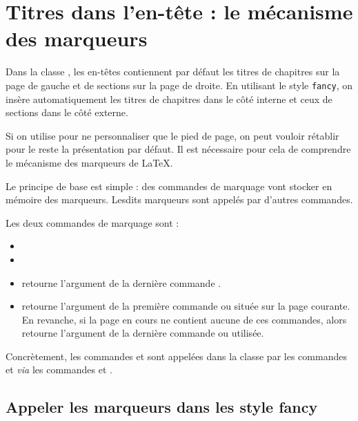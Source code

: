 \section{Titres dans l'en-tête : le mécanisme des marqueurs}

Dans la classe , les en-têtes contiennent par défaut les titres de chapitres sur la page de gauche et de sections sur la page de droite. En utilisant le style \verb|fancy|, on insère automatiquement les titres de chapitres dans le côté interne et ceux de sections dans le côté externe. 

Si on utilise  pour ne personnaliser que le pied de page, on peut  vouloir rétablir pour le reste la présentation  par défaut. Il est nécessaire pour cela de comprendre le mécanisme des marqueurs de \LaTeX. 

Le principe de base est simple : des commandes de marquage vont stocker en mémoire des marqueurs. Lesdits marqueurs sont appelés par d'autres commandes. 

Les deux commandes de marquage sont :
\begin{itemize}
\item {}
\item {}
\end{itemize}

\begin{itemize}
\item {} retourne l'argument  de la dernière commande .
\item {} retourne l'argument  de la première commande  ou   située sur la page courante. En revanche, si la page en cours ne contient aucune de ces commandes, alors  retourne l'argument  de la dernière commande  ou  utilisée.
\end{itemize}

Concrètement, les commandes   et  sont appelées  dans la classe  par les commandes  et  \emph{via} les commandes  et . 

\subsection{Appeler les marqueurs dans les style fancy}

